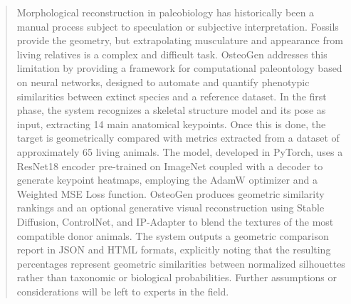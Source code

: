 \documentclass{article}
\begin{document}


\begin{abstract}
Morphological reconstruction in paleobiology has historically been a manual process subject to speculation or subjective interpretation. Fossils provide the geometry, but extrapolating musculature and appearance from living relatives is a complex and difficult task. OsteoGen addresses this limitation by providing a framework for computational paleontology based on neural networks, designed to automate and quantify phenotypic similarities between extinct species and a reference dataset. In the first phase, the system recognizes a skeletal structure model and its pose as input, extracting 14 main anatomical keypoints. Once this is done, the target is geometrically compared with metrics extracted from a dataset of approximately 65 living animals. The model, developed in PyTorch, uses a ResNet18 encoder pre-trained on ImageNet coupled with a decoder to generate keypoint heatmaps, employing the AdamW optimizer and a Weighted MSE Loss function. OsteoGen produces geometric similarity rankings and an optional generative visual reconstruction using Stable Diffusion, ControlNet, and IP-Adapter to blend the textures of the most compatible donor animals. The system outputs a geometric comparison report in JSON and HTML formats, explicitly noting that the resulting percentages represent geometric similarities between normalized silhouettes rather than taxonomic or biological probabilities. Further assumptions or considerations will be left to experts in the field.
\end{abstract}

\end{document}
